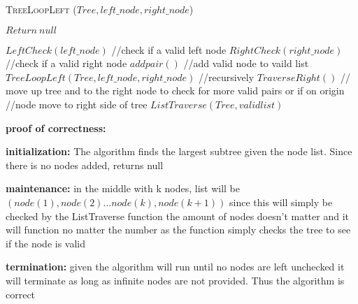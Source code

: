 \documentclass{article}
\begin{document}
\begin{algorithm} \caption{\textsc{TreeLoopLeft} ($Tree,left\_node,right\_node$)}\label{alg:seb}
    \begin{algorithmic}[1]
            \State$Return\ null$
        \EndIf{}

        \State$LeftCheck(left\_node)$ //check if a valid left node
        \State$RightCheck(right\_node)$ //check if a valid right node
            \State$addpair()$ //add valid node to vaild list
            \State$TreeLoopLeft(Tree,left\_node,right\_node)$ //recursively
            \Else{}
            \State$TraverseRight()$ // move up tree and to the right node to check for more valid pairs or if on origin 							       //node move to right side of tree
        \EndIf{}
        \State$ListTraverse(Tree, validlist)$
    \end{algorithmic}
\end{algorithm}

{ \bf proof of correctness:}

{\bf initialization: } The algorithm finds the largest subtree given the node list. Since there is no nodes added, returns null

{\bf  maintenance:} in the middle with k nodes, list will be $(node(1), node(2) \dots node(k),node(k+1))$ since this will simply be checked by the ListTraverse function the amount of nodes doesn't matter and it will function no matter the number as the function simply checks the tree to see if the node is valid

{\bf termination: } given the algorithm will run until no nodes are left unchecked it will terminate as long as infinite nodes are not provided. Thus the algorithm is correct
\end{document}

